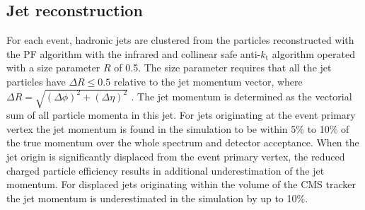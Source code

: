 \subsection{Jet reconstruction}

For each event, hadronic jets are clustered from the particles reconstructed with the PF algorithm
 with the infrared and collinear safe
 anti-$k_\mathrm{t}$ algorithm 
operated with a size parameter $R$ of 0.5. The size parameter requires that all the jet 
particles have $\Delta R \leq 0.5$ relative to the jet momentum vector, where
 $\Delta R=\sqrt{(\Delta\phi)^2 + (\Delta\eta)^2}$ \cite{Cacciari:2008gp}. 
The jet momentum is determined as the vectorial sum of all particle momenta in this jet.
For jets originating at the event primary vertex the jet momentum is found in the simulation to be within 5\% to 10\% of the true momentum over 
the whole \pt spectrum and detector acceptance. 
When the jet origin is significantly displaced from the event primary vertex, the reduced 
charged particle efficiency results in additional underestimation of the jet momentum. 
For displaced jets originating within the volume of the CMS tracker the jet momentum is underestimated in the simulation by up to 10\%.

